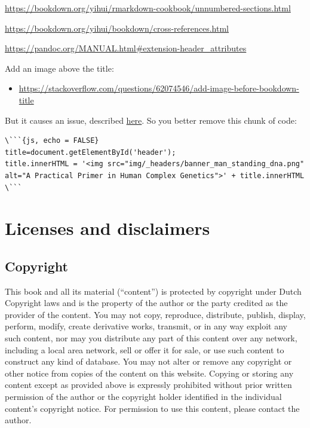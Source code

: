 \documentclass[
]{book}
\providecommand{\tightlist}{%
  \setlength{\itemsep}{0pt}\setlength{\parskip}{0pt}}
\begin{document}
\url{https://bookdown.org/yihui/rmarkdown-cookbook/unnumbered-sections.html}

\url{https://bookdown.org/yihui/bookdown/cross-references.html}

\url{https://pandoc.org/MANUAL.html\#extension-header_attributes}

Add an image above the title:

\begin{itemize}
\tightlist
\item
  \url{https://stackoverflow.com/questions/62074546/add-image-before-bookdown-title}
\end{itemize}

But it causes an issue, described \href{https://www.mobileread.com/forums/showthread.php?t=206086}{here}. So you better remove this chunk of code:

\begin{lstlisting}
\```{js, echo = FALSE}
title=document.getElementById('header');
title.innerHTML = '<img src="img/_headers/banner_man_standing_dna.png" alt="A Practical Primer in Human Complex Genetics">' + title.innerHTML
\```
\end{lstlisting}

\hypertarget{license}{%
\chapter{Licenses and disclaimers}\label{license}}

\hypertarget{copyright}{%
\section{Copyright}\label{copyright}}

This book and all its material (``content'') is protected by copyright under Dutch Copyright laws and is the property of the author or the party credited as the provider of the content. You may not copy, reproduce, distribute, publish, display, perform, modify, create derivative works, transmit, or in any way exploit any such content, nor may you distribute any part of this content over any network, including a local area network, sell or offer it for sale, or use such content to construct any kind of database. You may not alter or remove any copyright or other notice from copies of the content on this website. Copying or storing any content except as provided above is expressly prohibited without prior written permission of the author or the copyright holder identified in the individual content's copyright notice. For permission to use this content, please contact the author.
\end{document}
